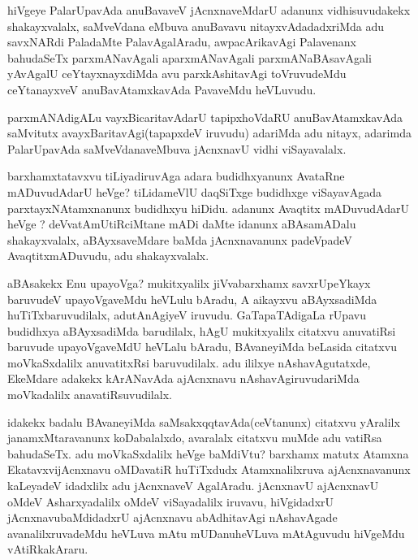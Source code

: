 \begin{center}

hiVgeye PalarUpavAda anuBavaveV jAcnxnaveMdarU adanunx vidhisuvudakekx
shakayxvalalx, saMveVdana eMbuva anuBavavu nitayxvAdadadxriMda adu
savxNARdi PaladaMte PalavAgalAradu, awpacArikavAgi Palavenanx
bahudaSeTx parxmANavAgali aparxmANavAgali parxmANaBAsavAgali yAvAgalU
ceYtayxnayxdiMda avu parxkAshitavAgi toVruvudeMdu ceYtanayxveV
anuBavAtamxkavAda PavaveMdu heVLuvudu.

parxmANAdigALu vayxBicaritavAdarU tapipxhoVdaRU anuBavAtamxkavAda
saMvitutx avayxBaritavAgi(tapapxdeV iruvudu) adariMda adu nitayx,
adarimda PalarUpavAda saMveVdanaveMbuva jAcnxnavU vidhi viSayavalalx.
\end{center}

\begin{center}


\end{center}

\begin{artha}
barxhamxtatavxvu tiLiyadiruvAga adara budidhxyanunx AvataRne
mADuvudAdarU heVge? tiLidameVlU daqSiTxge budidhxge viSayavAgada
parxtayxNAtamxnanunx budidhxyu hiDidu. adanunx Avaqtitx mADuvudAdarU
heVge ? deVvatAmUtiRciMtane mADi daMte idanunx aBAsamADalu
shakayxvalalx, aBAyxsaveMdare baMda jAcnxnavanunx padeVpadeV
AvaqtitxmADuvudu, adu shakayxvalalx.
\end{artha}

\begin{center}


\end{center}

\begin{artha}
aBAsakekx Enu upayoVga? mukitxyalilx jiVvabarxhamx savxrUpeYkayx
baruvudeV upayoVgaveMdu heVLulu bAradu, A aikayxvu aBAyxsadiMda
huTiTxbaruvudilalx, adutAnAgiyeV iruvudu. GaTapaTAdigaLa rUpavu
budidhxya aBAyxsadiMda barudilalx, hAgU mukitxyalilx citatxvu
anuvatiRsi baruvude upayoVgaveMdU heVLalu bAradu, BAvaneyiMda beLasida
citatxvu moVkaSxdalilx anuvatitxRsi baruvudilalx. adu ililxye
nAshavAgutatxde, EkeMdare adakekx kArANavAda ajAcnxnavu
nAshavAgiruvudariMda moVkadalilx anavatiRsuvudilalx.

idakekx badalu BAvaneyiMda saMsakxqqtavAda(ceVtanunx) citatxvu
yAralilx janamxMtaravanunx koDabalalxdo, avaralalx citatxvu muMde adu
vatiRsa bahudaSeTx. adu moVkaSxdalilx heVge baMdiVtu? barxhamx matutx
Atamxna EkatavxvijAcnxnavu oMDavatiR huTiTxdudx Atamxnalilxruva
ajAcnxnavanunx kaLeyadeV idadxlilx adu jAcnxnaveV
AgalAradu. jAcnxnavU ajAcnxnavU oMdeV Asharxyadalilx oMdeV
viSayadalilx iruvavu, hiVgidadxrU jAcnxnavubaMdidadxrU ajAcnxnavu
abAdhitavAgi nAshavAgade avanalilxruvadeMdu heVLuva mAtu mUDanuheVLuva
mAtAguvudu hiVgeMdu vAtiRkakAraru.
\end{artha}


